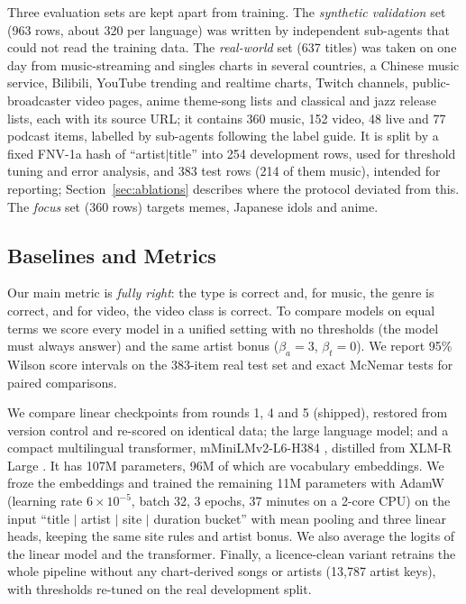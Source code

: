 \documentclass[11pt]{article}
\begin{document}
Three evaluation sets are kept apart from training. The \emph{synthetic validation} set (963 rows, about 320 per language) was written by independent sub-agents that could not read the training data. The \emph{real-world} set (637 titles) was taken on one day from music-streaming and singles charts in several countries, a Chinese music service, Bilibili, YouTube trending and realtime charts, Twitch channels, public-broadcaster video pages, anime theme-song lists and classical and jazz release lists, each with its source URL; it contains 360 music, 152 video, 48 live and 77 podcast items, labelled by sub-agents following the label guide. It is split by a fixed FNV-1a hash of ``artist$|$title'' into 254 development rows, used for threshold tuning and error analysis, and 383 test rows (214 of them music), intended for reporting; Section~\ref{sec:ablations} describes where the protocol deviated from this. The \emph{focus} set (360 rows) targets memes, Japanese idols and anime.

\subsection{Baselines and Metrics}
\label{sec:metrics}

Our main metric is \emph{fully right}: the type is correct and, for music, the genre is correct, and for video, the video class is correct. To compare models on equal terms we score every model in a unified setting with no thresholds (the model must always answer) and the same artist bonus ($\beta_a = 3$, $\beta_t = 0$). We report 95\% Wilson score intervals \citep{wilson1927probable} on the 383-item real test set and exact McNemar tests \citep{mcnemar1947note} for paired comparisons.

We compare linear checkpoints from rounds 1, 4 and 5 (shipped), restored from version control and re-scored on identical data; the large language model; and a compact multilingual transformer, mMiniLMv2-L6-H384 \citep{wang2021minilmv2}, distilled from XLM-R Large \citep{conneau2020unsupervised}. It has 107M parameters, 96M of which are vocabulary embeddings. We froze the embeddings and trained the remaining 11M parameters with AdamW \citep{loshchilov2017decoupled} (learning rate $6\times10^{-5}$, batch 32, 3 epochs, 37 minutes on a 2-core CPU) on the input ``title $|$ artist $|$ site $|$ duration bucket'' with mean pooling and three linear heads, keeping the same site rules and artist bonus. We also average the logits of the linear model and the transformer. Finally, a licence-clean variant retrains the whole pipeline without any chart-derived songs or artists (13,787 artist keys), with thresholds re-tuned on the real development split.
\end{document}
